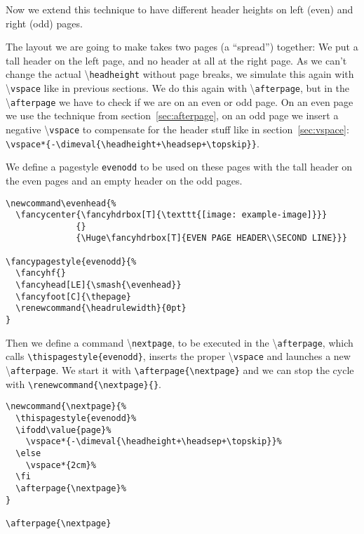 \documentclass[twoside]{article}
\newcommand\cs[1]{\textbackslash\texttt{#1}}
\begin{document}
\noindent
\begin{boxedminipage}{\textwidth}
Now we extend this technique to have different header heights on left
(even) and right (odd) pages.

The layout we are going to make takes two pages (a ``spread'') together: We put a tall header on the left page, and no header at all at the right page. As we can't change the actual \cs{headheight} without page breaks, we simulate this again with \cs{vspace} like in previous sections. We do this again with \cs{afterpage}, but in the  \cs{afterpage} we have to check if we are on an even or odd page. On an even page we use the technique from section~\ref{sec:afterpage}, on an odd page we insert a negative \cs{vspace} to compensate for the header stuff like in section~\ref{sec:vspace}:\\[1ex]
\verb|\vspace*{-\dimeval{\headheight+\headsep+\topskip}}|.

We define a pagestyle \texttt{evenodd} to be used on these pages with
the tall header on the even pages and an empty header on the odd pages.

\begin{verbatim}
\newcommand\evenhead{%
  \fancycenter{\fancyhdrbox[T]{\texttt{[image: example-image]}}}
              {}
              {\Huge\fancyhdrbox[T]{EVEN PAGE HEADER\\SECOND LINE}}}

\fancypagestyle{evenodd}{%
  \fancyhf{}
  \fancyhead[LE]{\smash{\evenhead}}
  \fancyfoot[C]{\thepage}
  \renewcommand{\headrulewidth}{0pt}
}
\end{verbatim}
% 
% 
Then we define a command \cs{nextpage}, to be executed in the
\cs{afterpage}, which calls \verb|\thispagestyle{evenodd}|,
inserts the proper \cs{vspace} and launches
a new \cs{afterpage}. We start it with \verb|\afterpage{\nextpage}|
and we can stop the cycle with \verb|\renewcommand{\nextpage}{}|.

\begin{verbatim}
\newcommand{\nextpage}{%
  \thispagestyle{evenodd}%
  \ifodd\value{page}%
    \vspace*{-\dimeval{\headheight+\headsep+\topskip}}%
  \else
    \vspace*{2cm}%
  \fi
  \afterpage{\nextpage}%
}

\afterpage{\nextpage}
\end{verbatim}
\end{boxedminipage}
\end{document}
